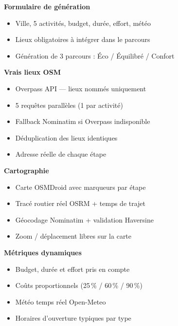 \documentclass[a4paper,12pt,openany]{report}
\begin{document}
\begin{tcolorbox}[enhanced, colback=lightbg, colframe=navy, arc=4pt,
  boxrule=0.6pt, left=8pt, right=8pt, top=6pt, bottom=6pt,
  title={\textbf{TravelPath — Générateur d'itinéraires}},
  fonttitle=\bfseries\small\color{white},
  colbacktitle=navy]

\begin{multicols}{2}
\small
\textbf{Formulaire de génération}
\begin{itemize}[leftmargin=*,itemsep=0pt,topsep=2pt]
  \item Ville, 5 activités, budget, durée, effort, météo
  \item Lieux obligatoires à intégrer dans le parcours
  \item Génération de 3 parcours : Éco / Équilibré / Confort
\end{itemize}

\textbf{Vrais lieux OSM}
\begin{itemize}[leftmargin=*,itemsep=0pt,topsep=2pt]
  \item Overpass API — lieux nommés uniquement
  \item 5 requêtes parallèles (1 par activité)
  \item Fallback Nominatim si Overpass indisponible
  \item Déduplication des lieux identiques
  \item Adresse réelle de chaque étape
\end{itemize}

\textbf{Cartographie}
\begin{itemize}[leftmargin=*,itemsep=0pt,topsep=2pt]
  \item Carte OSMDroid avec marqueurs par étape
  \item Tracé routier réel OSRM + temps de trajet
  \item Géocodage Nominatim + validation Haversine
  \item Zoom / déplacement libres sur la carte
\end{itemize}

\columnbreak

\textbf{Métriques dynamiques}
\begin{itemize}[leftmargin=*,itemsep=0pt,topsep=2pt]
  \item Budget, durée et effort pris en compte
  \item Coûts proportionnels (25\,\% / 60\,\% / 90\,\%)
  \item Météo temps réel Open-Meteo
  \item Horaires d'ouverture typiques par type
\end{itemize}


\end{multicols}
\end{tcolorbox}
\end{document}
